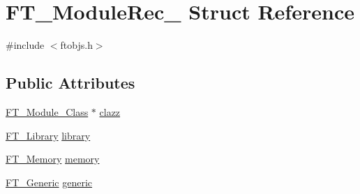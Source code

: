 \hypertarget{struct_f_t___module_rec__}{\section{F\-T\-\_\-\-Module\-Rec\-\_\- Struct Reference}
\label{struct_f_t___module_rec__}
}


{\ttfamily \#include $<$ftobjs.\-h$>$}

\subsection*{Public Attributes}
\begin{DoxyCompactItemize}
\item 
\hyperlink{ftmodapi_8h_a1bdc5c23cae8b7c61c05966edc4e8343}{F\-T\-\_\-\-Module\-\_\-\-Class} $\ast$ \hyperlink{struct_f_t___module_rec___ac762573dc13af2d2af190a9e855742f5}{clazz}
\item 
\hyperlink{freetype_8h_a92857f8bf079b7b9ef5d3ce74cf89ef5}{F\-T\-\_\-\-Library} \hyperlink{struct_f_t___module_rec___ac3d04fbdc2988bf9a39f4ad6d3cb4b5f}{library}
\item 
\hyperlink{ftsystem_8h_a67ec7ea35cde99a89a65e9f827a9ad3a}{F\-T\-\_\-\-Memory} \hyperlink{struct_f_t___module_rec___a33113e9eb2d6cd8ee6666da75ff8e108}{memory}
\item 
\hyperlink{fttypes_8h_ae15e8550dd7d863328686aadaead5c77}{F\-T\-\_\-\-Generic} \hyperlink{struct_f_t___module_rec___a860be13b9f239c42cacdbc5d6f81d44a}{generic}
\end{DoxyCompactItemize}


